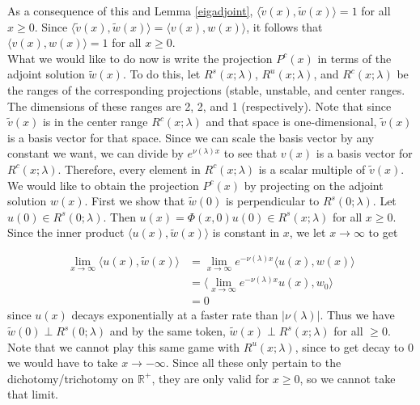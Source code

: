 \documentclass[12pt]{article}
\def\R{{\mathbb R}}
\begin{document}
As a consequence of this and Lemma \ref{eigadjoint}, $\langle \tilde{v}(x), \tilde{w}(x) \rangle = 1$ for all $x \geq 0$. Since $\langle \tilde{v}(x), \tilde{w}(x) \rangle = \langle v(x), w(x) \rangle$, it follows that $\langle v(x), w(x) \rangle = 1$ for all $x \geq 0$.\\

What we would like to do now is write the projection $P^c(x)$ in terms of the adjoint solution $\tilde{w}(x)$. To do this, let $R^s(x; \lambda)$, $R^u(x; \lambda)$, and $R^c(x; \lambda)$ be the ranges of the corresponding projections (stable, unstable, and center ranges. The dimensions of these ranges are 2, 2, and 1 (respectively). Note that since $\tilde{v}(x)$ is in the center range $R^c(x; \lambda)$ and that space is one-dimensional, $\tilde{v}(x)$ is a basis vector for that space. Since we can scale the basis vector by any constant we want, we can divide by $e^{\nu(\lambda) x }$ to see that $v(x)$ is a basis vector for $R^c(x; \lambda)$. Therefore, every element in $R^c(x; \lambda)$ is a scalar multiple of $\tilde{v}(x)$. \\

We would like to obtain the projection $P^c(x)$ by projecting on the adjoint solution $w(x)$. First we show that $\tilde{w}(0)$ is perpendicular to $R^s(0; \lambda)$. Let $u(0) \in R^s(0; \lambda)$. Then $u(x) = \Phi(x, 0)u(0) \in R^s(x; \lambda)$ for all $x \geq 0$. Since the inner product $\langle u(x), \tilde{w}(x) \rangle$ is constant in $x$, we let $x \rightarrow \infty$ to get

\begin{align*}
\lim_{x \rightarrow \infty} \langle u(x), \tilde{w}(x) \rangle &= \lim_{x \rightarrow \infty} e^{-\nu(\lambda) x} \langle u(x), w(x) \rangle \\
&= \langle \lim_{x \rightarrow \infty} e^{-\nu(\lambda) x} u(x), w_0 \rangle \\
&= 0
\end{align*}
since $u(x)$ decays exponentially at a faster rate than $|\nu(\lambda)|$. Thus we have $\tilde{w}(0) \perp R^s(0; \lambda)$ and by the same token, $\tilde{w}(x) \perp R^s(x; \lambda)$ for all $ \geq 0$.\\

Note that we cannot play this same game with $R^u(x; \lambda)$, since to get decay to 0 we would have to take $x \rightarrow -\infty$. Since all these only pertain to the dichotomy/trichotomy on $\R^+$, they are only valid for $x \geq 0$, so we cannot take that limit.\\
\end{document}
